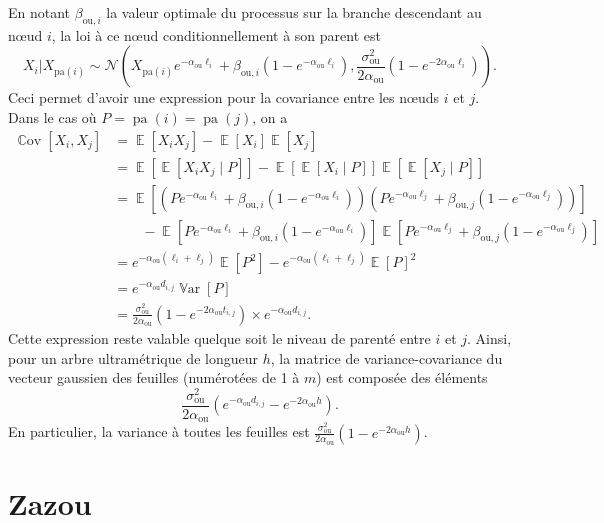 \documentclass[12pt,a4paper]{reedthesis}
\DeclareMathOperator*{\esp}{\mathbb{E}}
\DeclareMathOperator*{\var}{\mathbb{V}\text{ar}}
\DeclareMathOperator*{\cov}{\mathbb{C}\text{ov}}
\newcommand \EE [1]{\esp\left[{#1}\right]}
\newcommand \VV [1]{\var\left[{#1}\right]}
\newcommand \CC [1]{\cov\left[{#1}\right]}
\newcommand \ou [1]{{#1}_{\text{ou}}}
\newcommand \oui [2]{{#1}_{\text{ou},#2}}
\newcommand \optim {\beta}
\DeclareMathOperator*{\pa}{pa}
\theoremstyle{definition}
\theoremstyle{definition}
\theoremstyle{definition}
\theoremstyle{remark}
\begin{document}
En notant \(\oui{\optim}{i}\) la valeur optimale du processus sur la branche descendant au nœud \(i\), la loi à ce nœud conditionnellement à son parent est
\begin{equation*}
X_i|X_{\text{pa}(i)} \sim \mathcal{N}\left( X_{\text{pa}(i)} e^{-\ou{\alpha} \ell_i } + \oui{\optim}{i} \left(1-e^{-\ou{\alpha} \ell_i}\right), \frac{\ou{\sigma}^2}{2\ou{\alpha}} \left(1 - e^{-2\ou{\alpha} \ell_i}\right) \right).
\end{equation*}
Ceci permet d'avoir une expression pour la covariance entre les nœuds \(i\) et \(j\). Dans le cas où \(P = \pa(i)=\pa(j)\), on a
\begin{equation*}
\begin{aligned}
\CC{X_i, X_j} & = \EE{X_iX_j} - \EE{X_i} \EE{X_j} \\
& = \EE{\EE{X_iX_j\mid P}} - \EE{\EE{X_i\mid P}} \EE{\EE{X_j \mid P }} \\
& = \EE{\left(P e^{-\ou{\alpha}\ell_i} + \oui{\optim}{i} \left(1-e^{-\ou{\alpha}\ell_i}\right)\right) \left(P e^{-\ou{\alpha}\ell_j} + \oui{\optim}{j} \left(1-e^{-\ou{\alpha}\ell_j}\right)\right)} \\
& \qquad - \EE{P e^{-\ou{\alpha}\ell_i} + \oui{\optim}{i} \left(1-e^{-\ou{\alpha}\ell_i}\right)} \EE{P e^{-\ou{\alpha}\ell_j} + \oui{\optim}{j} \left(1-e^{-\ou{\alpha}\ell_j}\right)} \\
& = e^{-\ou{\alpha}(\ell_i + \ell_j)} \EE{P^2} - e^{-\ou{\alpha}(\ell_i + \ell_j)} \EE{P}^2 \\
& = e^{-\ou{\alpha} d_{i,j}} \VV{P} \\
& = \frac{\ou{\sigma}^2}{2\ou{\alpha}}\left(1 - e^{-2\ou{\alpha} t_{i,j} }\right) \times e^{-\ou{\alpha} d_{i,j}}.
\end{aligned}
\end{equation*}
Cette expression reste valable quelque soit le niveau de parenté entre \(i\) et \(j\). Ainsi, pour un arbre ultramétrique de longueur \(h\), la matrice de variance-covariance du vecteur gaussien des feuilles (numérotées de 1 à \(m\)) est composée des éléments
\begin{equation}
\label{eq:covariance}
\frac{\ou{\sigma}^2}{2\ou{\alpha}}\left(e^{-\ou{\alpha} d_{i,j}} - e^{-2\ou{\alpha} h}\right).
\end{equation}
En particulier, la variance à toutes les feuilles est \(\frac{\ou{\sigma}^2}{2\ou{\alpha}}\left(1 - e^{-2\ou{\alpha} h}\right)\).

\hypertarget{zazousection}{%
\section{Zazou}\label{zazousection}}
\end{document}

